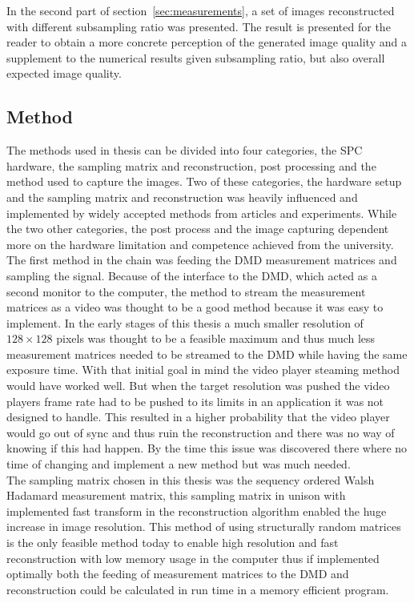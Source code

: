 In the second part of section~\ref{sec:measurements}, a set of images reconstructed with different subsampling ratio was presented. The result is presented for the reader to obtain a more concrete perception of the generated image quality and a supplement to the numerical results given subsampling ratio, but also overall expected image quality.

\subsection{Method} %

The methods used in thesis can be divided into four categories, the SPC hardware, the sampling matrix and reconstruction, post processing and the method used to capture the images. Two of these categories, the hardware setup and the sampling matrix and reconstruction was heavily influenced and implemented by widely accepted methods from articles and experiments. While the two other categories, the post process and the image capturing dependent more on the hardware limitation and competence achieved from the university.\\[0.1in]

The first method in the chain was feeding the DMD measurement matrices and sampling the signal. Because of the interface to the DMD, which acted as a second monitor to the computer, the method to stream the measurement matrices as a video was thought to be a good method because it was easy to implement. In the early stages of this thesis a much smaller resolution of $128 \times 128$ pixels was thought to be a feasible maximum and thus much less measurement matrices needed to be streamed to the DMD while having the same exposure time. With that initial goal in mind the video player steaming method would have worked well. But when the target resolution was pushed the video players frame rate had to be pushed to its limits in an application it was not designed to handle. This resulted in a higher probability that the video player would go out of sync and thus ruin the reconstruction and there was no way of knowing if this had happen. By the time this issue was discovered there where no time of changing and implement a new method but was much needed.\\[0.1in]

The sampling matrix chosen in this thesis was the sequency ordered Walsh Hadamard measurement matrix, this sampling matrix in unison with implemented fast transform in the reconstruction algorithm enabled the huge increase in image resolution. This method of using structurally random matrices is the only feasible method today to enable high resolution and fast reconstruction with low memory usage in the computer thus if implemented optimally both the feeding of measurement matrices to the DMD and reconstruction could be calculated in run time in a memory efficient program.\\[0.1in]

